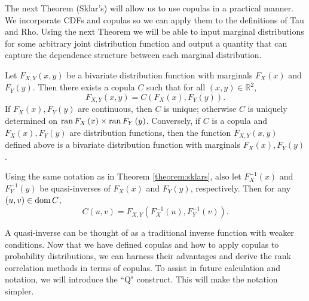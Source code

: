 The next Theorem (Sklar's) will allow us to use copulas in a practical manner. We incorporate CDFs and copulas so we can apply them to the definitions of Tau and Rho. Using the next Theorem we will be able to input marginal distributions for some arbitrary joint distribution function and output a quantity that can capture the dependence structure between each marginal distribution.
\begin{theorem}\label{theorem:sklars}
    Let $F_{X,Y}\left(x,y\right)$ be a bivariate distribution function with marginals $F_X\left(x\right)$ and $F_Y\left(y\right)$. Then there exists a copula $C$ such that for all $\left(x,y\right)\in\mathbb{R}^2$, $$F_{X,Y}\left(x,y\right)=C\left(F_X\left(x\right),F_Y\left(y\right)\right).$$ If $F_X\left(x\right),F_Y\left(y\right)$ are continuous, then $C$ is unique; otherwise $C$ is uniquely determined on $\operatorname{ran} F_X\left(x\right)\times\operatorname{ran} F_Y\left(y\right)$. Conversely, if $C$ is a copula and $F_X\left(x\right),F_Y\left(y\right)$ are distribution functions, then the function $F_{X,Y}\left(x,y\right)$ defined above is a bivariate distribution function with marginals $F_X\left(x\right),F_Y\left(y\right)$.
\end{theorem}
\begin{corollary}\label{cor:sklars}
    Using the same notation as in Theorem \ref{theorem:sklars}, also let $F_X^{-1}\left(x\right)$ and $F_Y^{-1}\left(y\right)$ be quasi-inverses of $F_X\left(x\right)$ and $F_Y\left(y\right)$, respectively. Then for any $(u,v)\in\operatorname{dom} C$, $$C\left(u,v\right)=F_{X,Y}\left(F_X^{-1}\left(u\right),F_Y^{-1}\left(v\right)\right).$$
\end{corollary}
A quasi-inverse can be thought of as a traditional inverse function with weaker conditions. Now that we have defined copulas and how to apply copulas to probability distributions, we can harness their advantages and derive the rank correlation methods in terms of copulas. To assist in future calculation and notation, we will introduce the ``Q" construct. This will make the notation simpler.

